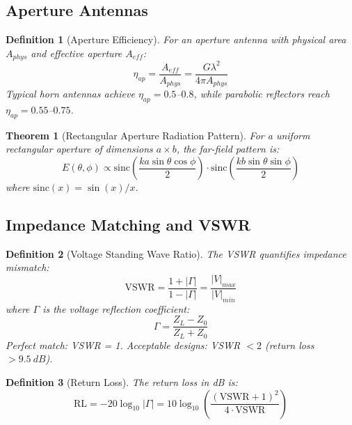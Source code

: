 \documentclass[a4paper, 11pt]{article}
\newtheorem{definition}{Definition}[section]
\newtheorem{theorem}{Theorem}[section]
\begin{document}
\subsection{Aperture Antennas}

\begin{definition}[Aperture Efficiency]
For an aperture antenna with physical area $A_{phys}$ and effective aperture $A_{eff}$:
\begin{equation}
\eta_{ap} = \frac{A_{eff}}{A_{phys}} = \frac{G\lambda^2}{4\pi A_{phys}}
\end{equation}
Typical horn antennas achieve $\eta_{ap} = 0.5$--$0.8$, while parabolic reflectors reach $\eta_{ap} = 0.55$--$0.75$.
\end{definition}

\begin{theorem}[Rectangular Aperture Radiation Pattern]
For a uniform rectangular aperture of dimensions $a \times b$, the far-field pattern is:
\begin{equation}
E(\theta, \phi) \propto \text{sinc}\left(\frac{ka\sin\theta\cos\phi}{2}\right) \cdot \text{sinc}\left(\frac{kb\sin\theta\sin\phi}{2}\right)
\end{equation}
where $\text{sinc}(x) = \sin(x)/x$.
\end{theorem}

\subsection{Impedance Matching and VSWR}

\begin{definition}[Voltage Standing Wave Ratio]
The VSWR quantifies impedance mismatch:
\begin{equation}
\text{VSWR} = \frac{1 + |\Gamma|}{1 - |\Gamma|} = \frac{|V|_{max}}{|V|_{min}}
\end{equation}
where $\Gamma$ is the voltage reflection coefficient:
\begin{equation}
\Gamma = \frac{Z_L - Z_0}{Z_L + Z_0}
\end{equation}
Perfect match: VSWR = 1. Acceptable designs: VSWR $< 2$ (return loss $> \SI{9.5}{dB}$).
\end{definition}

\begin{definition}[Return Loss]
The return loss in dB is:
\begin{equation}
\text{RL} = -20\log_{10}|\Gamma| = 10\log_{10}\left(\frac{(\text{VSWR}+1)^2}{4\cdot\text{VSWR}}\right)
\end{equation}
\end{definition}
\end{document}
